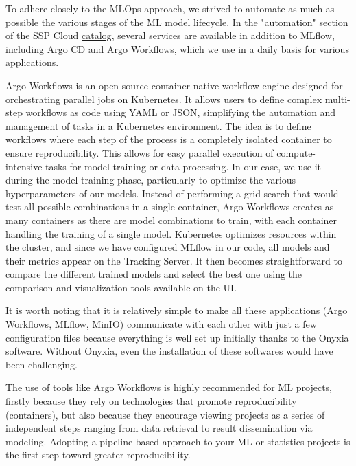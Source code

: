 To adhere closely to the MLOps approach, we strived to automate as much as possible the various stages of the ML model lifecycle. In the "automation" section of the SSP Cloud \href{https://datalab.sspcloud.fr/catalog/automation}{catalog}, several services are available in addition to MLflow, including Argo CD and Argo Workflows, which we use in a daily basis for various applications.

Argo Workflows is an open-source container-native workflow engine designed for orchestrating parallel jobs on Kubernetes. It allows users to define complex multi-step workflows as code using YAML or JSON, simplifying the automation and management of tasks in a Kubernetes environment. The idea is to define workflows where each step of the process is a completely isolated container to ensure reproducibility. This allows for easy parallel execution of compute-intensive tasks for model training or data processing. In our case, we use it during the model training phase, particularly to optimize the various hyperparameters of our models. Instead of performing a grid search that would test all possible combinations in a single container, Argo Workflows creates as many containers as there are model combinations to train, with each container handling the training of a single model. Kubernetes optimizes resources within the cluster, and since we have configured MLflow in our code, all models and their metrics appear on the Tracking Server. It then becomes straightforward to compare the different trained models and select the best one using the comparison and visualization tools available on the UI. 

It is worth noting that it is relatively simple to make all these applications (Argo Workflows, MLflow, MinIO) communicate with each other with just a few configuration files because everything is well set up initially thanks to the Onyxia software. Without Onyxia, even the installation of these softwares would have been challenging.

The use of tools like Argo Workflows is highly recommended for ML projects, firstly because they rely on technologies that promote reproducibility (containers), but also because they encourage viewing projects as a series of independent steps ranging from data retrieval to result dissemination via modeling. Adopting a pipeline-based approach to your ML or statistics projects is the first step toward greater reproducibility.


